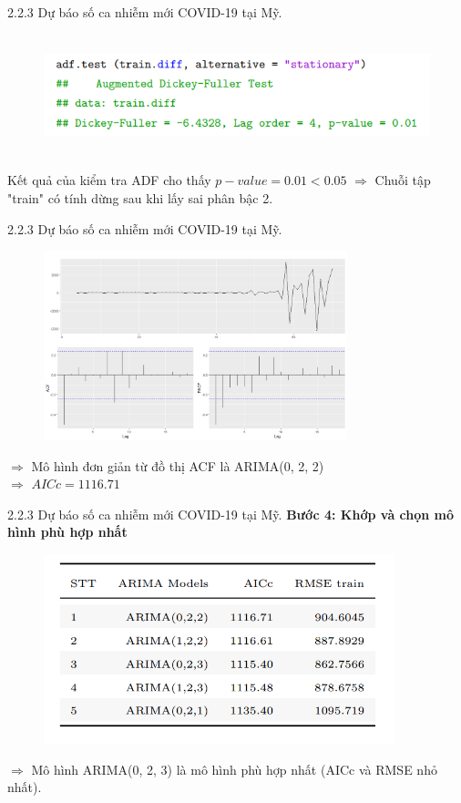 \documentclass[notheorems,envcountsect,hyperref=unicode]{beamer}
\begin{document}
\begin{frame}{2.2.3 Dự báo số ca nhiễm mới COVID-19 tại Mỹ.}
	\begin{figure}[!htb]
		\centering
		\includegraphics[width=1\linewidth,height=3.5cm]{d3} 
	\end{figure}
Kết quả của kiểm tra ADF cho thấy $p-value = 0.01 < 0.05$ $\Longrightarrow$ Chuỗi tập "train" có tính dừng sau khi lấy sai phân bậc 2.
\end{frame}

\begin{frame}{2.2.3 Dự báo số ca nhiễm mới COVID-19 tại Mỹ.}
	\begin{figure}[!htb]
		\centering
		\includegraphics[width=1\linewidth,height=5.5cm]{US2} 
	\end{figure}
\pause
$\Longrightarrow$  Mô hình đơn giản từ đồ thị ACF là ARIMA(0, 2, 2)\\ $\Longrightarrow$  \pause $AICc= 1116.71$
\end{frame}

\begin{frame}{2.2.3 Dự báo số ca nhiễm mới COVID-19 tại Mỹ.}
\textbf{Bước 4: Khớp và chọn mô hình phù hợp nhất}
	\begin{figure}[!htb]
	\centering
	\includegraphics[width=1\linewidth,height=5.5cm]{bus1} 
\end{figure}
$\Longrightarrow$ Mô hình ARIMA(0, 2, 3) là mô hình phù hợp nhất (AICc và RMSE nhỏ nhất).
\end{frame}
\end{document}
